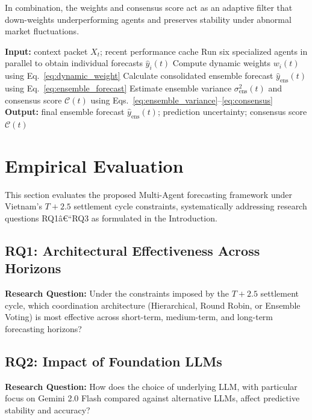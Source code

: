 \documentclass{ieeeaccess}
\begin{document}
In combination, the weights and consensus score act as an adaptive filter that down-weights underperforming agents and preserves stability under abnormal market fluctuations.

    \begin{algorithmic}[1]
    \STATE \textbf{Input:} context packet $X_t$; recent performance cache
    \STATE Run six specialized agents in parallel to obtain individual forecasts $\hat{y}_i(t)$
    \STATE Compute dynamic weights $w_i(t)$ using Eq.~\eqref{eq:dynamic_weight}
    \STATE Calculate consolidated ensemble forecast $\hat{y}_{\text{ens}}(t)$ using Eq.~\eqref{eq:ensemble_forecast}
    \STATE Estimate ensemble variance $\sigma^2_{\text{ens}}(t)$ and consensus score $\mathcal{C}(t)$ using Eqs.~\eqref{eq:ensemble_variance}--\eqref{eq:consensus}
    \STATE \textbf{Output:} final ensemble forecast $\hat{y}_{\text{ens}}(t)$; prediction uncertainty; consensus score $\mathcal{C}(t)$
    \end{algorithmic}







\section{Empirical Evaluation}

This section evaluates the proposed Multi-Agent forecasting framework under Vietnam's $T+2.5$ settlement cycle constraints, systematically addressing research questions RQ1â€“RQ3 as formulated in the Introduction.

\subsection{RQ1: Architectural Effectiveness Across Horizons}

\textbf{Research Question:} Under the constraints imposed by the $T+2.5$ settlement cycle, which coordination architecture (Hierarchical, Round Robin, or Ensemble Voting) is most effective across short-term, medium-term, and long-term forecasting horizons?


\subsection{RQ2: Impact of Foundation LLMs}

\textbf{Research Question:} How does the choice of underlying LLM, with particular focus on Gemini 2.0 Flash compared against alternative LLMs, affect predictive stability and accuracy?
\end{document}
